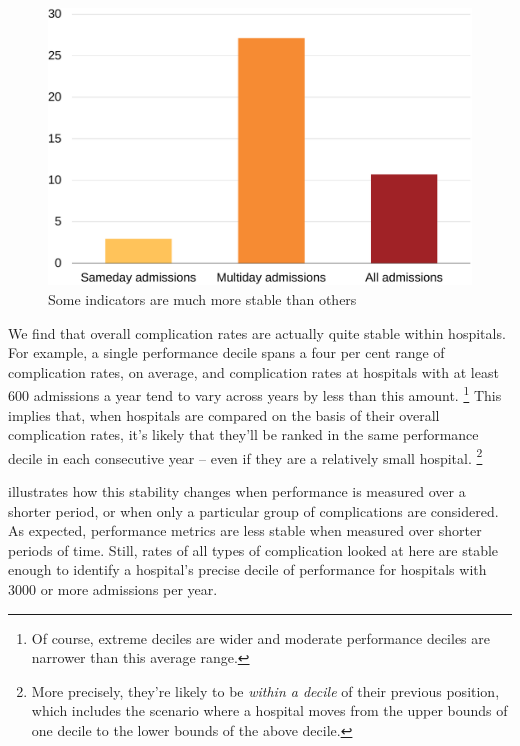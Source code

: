 \documentclass[submission]{grattan}
\begin{document}
\begin{figure}
\caption{Some indicators are much more stable than others}\label{fig:some-indicators-are-much-more-stable-than-others}
\includegraphics[page=35]{atlas/comps_charts.pdf}
\end{figure}

We find that overall complication rates are actually quite stable within hospitals.
For example, a single performance decile spans a four per cent range of complication rates, on average, and complication rates at hospitals with at least 600 admissions a year tend to vary across years by less than this amount.%
\footnote{Of course, extreme deciles are wider and moderate performance deciles are narrower than this average range.}
This implies that, when hospitals are compared on the basis of their overall complication rates, it's likely that they'll be ranked in the same performance decile in each consecutive year -- even if they are a relatively small hospital.%
\footnote{More precisely, they're likely to be \emph{within a decile} of their previous position, which includes the scenario where a hospital moves from the upper bounds of one decile to the lower bounds of the above decile.}

 illustrates how this stability changes when performance is measured over a shorter period, or when only a particular group of complications are considered.
As expected, performance metrics are less stable when measured over shorter periods of time.
Still, rates of all types of complication looked at here are stable enough to identify a hospital's precise decile of performance for hospitals with 3000 or more admissions per year.
\end{document}
